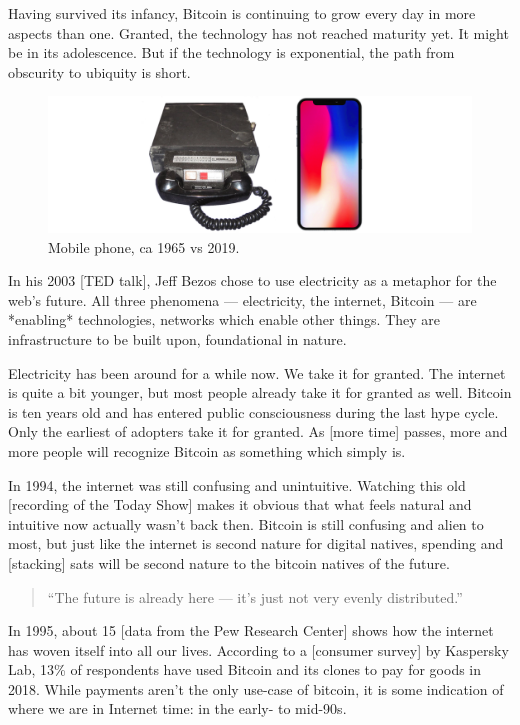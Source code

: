 Having survived its infancy, Bitcoin is continuing to grow every day in
more aspects than one. Granted, the technology has not reached maturity
yet. It might be in its adolescence. But if the technology is
exponential, the path from obscurity to ubiquity is short.

\begin{figure}
  \includegraphics{assets/images/mobile-phone.png}
  \caption{Mobile phone, ca 1965 vs 2019.}
  \label{fig:mobile-phone}
\end{figure}

In his 2003 [TED talk], Jeff Bezos chose to use electricity as a
metaphor for the web's future. All three phenomena --- electricity, the
internet, Bitcoin --- are *enabling* technologies, networks which enable
other things. They are infrastructure to be built upon, foundational in
nature.

Electricity has been around for a while now. We take it for granted. The
internet is quite a bit younger, but most people already take it for
granted as well. Bitcoin is ten years old and has entered public
consciousness during the last hype cycle. Only the earliest of adopters
take it for granted. As [more time] passes, more and more people will
recognize Bitcoin as something which simply is.

In 1994, the internet was still confusing and unintuitive. Watching this
old [recording of the Today Show] makes it obvious that what feels
natural and intuitive now actually wasn't back then. Bitcoin is still
confusing and alien to most, but just like the internet is second nature
for digital natives, spending and [stacking] sats will be second nature
to the bitcoin natives of the future.

\begin{quotation}
``The future is already here --- it's just not very evenly
distributed.''
\end{quotation}

In 1995, about 15%
[data from the Pew Research Center] shows how the internet has woven
itself into all our lives. According to a [consumer survey] by Kaspersky
Lab, 13\% of respondents have used Bitcoin and its clones to pay for
goods in 2018. While payments aren't the only use-case of bitcoin, it is
some indication of where we are in Internet time: in the early- to
mid-90s.

